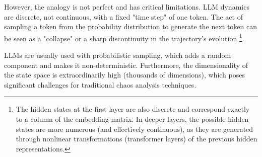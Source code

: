 \documentclass[a4paper,12pt]{article}
\begin{document}
However, the analogy is not perfect and has critical limitations. LLM dynamics are discrete, not continuous, with a fixed "time step" of one token. The act of sampling a token from the probability distribution to generate the next token can be seen as a "collapse" or a sharp discontinuity in the trajectory's evolution \footnote{The hidden states at the first layer are also discrete and correspond exactly to a column of the embedding matrix. In deeper layers, the possible hidden states are more numerous (and effectively continuous), as they are generated through nonlinear transformations (transformer layers) of the previous hidden representations.}.

LLMs are usually used with probabilistic sampling, which adds a random component and makes it non-deterministic. Furthermore, the dimensionality of the state space is extraordinarily high (thousands of dimensions), which poses significant challenges for traditional chaos analysis techniques.



\end{document}
